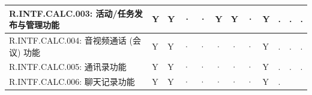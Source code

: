 \begin{table}[htbp]
\begin{tabular}{|p{9em}|p{2em}|p{2em}|p{2em}|p{2em}|p{2em}|
                            p{2em}|p{2em}|p{2em}|p{2em}|p{2em}|p{2em}|}
            \hline %
            R.INTF.CALC.003: 活动/任务发布与管理功能
                & Y                     & Y                 & · 
                & ·                     & Y                 & Y 
                & ·                     & Y                 & .
                & .                     & . \\
            \hline %
            R.INTF.CALC.004: 音视频通话 (会议) 功能
                & Y                     & Y                 & · 
                & ·                     & ·                 & · 
                & ·                     & Y                 & .
                & .                     & . \\
            \hline %
            R.INTF.CALC.005: 通讯录功能
                & Y                     & Y                 & · 
                & ·                     & ·                 & · 
                & ·                     & Y                 & .
                & .                     & . \\
            \hline %
            R.INTF.CALC.006: 聊天记录功能
                & Y                     & Y                 & · 
                & ·                     & ·                 & · 
                & ·                     & Y                 & .

\end{tabular}
\end{table}

